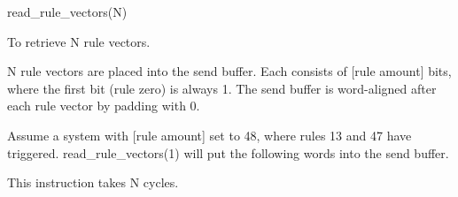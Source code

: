 

\format
read\_rule\_vectors(N)

\purpose

To retrieve N rule vectors.

\description

N rule vectors are placed into the send buffer.
Each consists of [rule amount] bits, where the first bit (rule zero) is always 1.
The send buffer is word-aligned after each rule vector by padding with 0.

\example

Assume a system with [rule amount] set to 48, where rules 13 and 47 have triggered.
read\_rule\_vectors(1) will put the following words into the send buffer.


\notes

This instruction takes N cycles.
